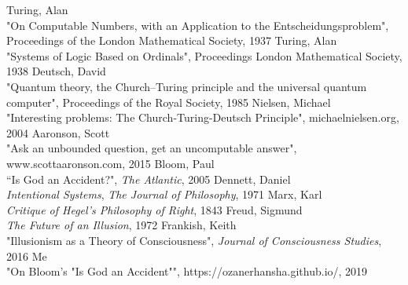 \documentclass[11pt]{diazessay} %
\begin{document}
% 
%
% 
\begin{thebibliography}{999}
	Turing, Alan\\
	"On Computable Numbers, with an Application to the Entscheidungsproblem", Proceedings of the London Mathematical Society, 1937
  Turing, Alan\\
  "Systems of Logic Based on Ordinals", Proceedings London Mathematical Society, 1938
	Deutsch, David\\
	"Quantum theory, the Church–Turing principle and the universal quantum computer", Proceedings of the Royal Society, 1985
  Nielsen, Michael\\
  "Interesting problems: The Church-Turing-Deutsch Principle", michaelnielsen.org, 2004
  Aaronson, Scott\\
  "Ask an unbounded question, get an uncomputable answer", www.scottaaronson.com, 2015
  Bloom, Paul\\
  ``Is God an Accident?", \emph{The Atlantic}, 2005
  Dennett, Daniel\\
  \emph{Intentional Systems}, \emph{The Journal of Philosophy}, 1971
  Marx, Karl\\
  \emph{Critique of Hegel's Philosophy of Right}, 1843
  Freud, Sigmund\\
  \emph{The Future of an Illusion}, 1972
  Frankish, Keith\\
  "Illusionism as a Theory of Consciousness", \emph{Journal of Consciousness Studies}, 2016
  Me\\
  "On Bloom's "Is God an Accident"", https://ozanerhansha.github.io/, 2019
\end{thebibliography}

\end{document}
